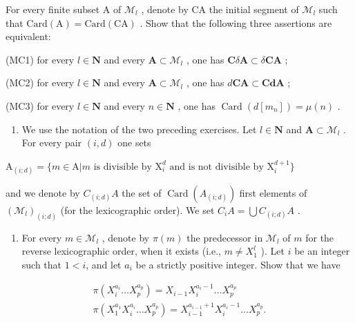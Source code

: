 For every finite subset A of \(\mathcal{M}_{l}\) , denote by CA the initial segment of \(\mathcal{M}_{l}\) such that \(\mathrm{Card(A)} = \mathrm{Card(CA)}\) . Show that the following three assertions are equivalent:

(MC1) for every \(l \in \mathbf{N}\) and every \(\mathbf{A} \subset \mathcal{M}_l\) , one has \(\mathbf{C}\delta \mathbf{A} \subset \delta \mathbf{CA}\) ;

(MC2) for every \(l \in \mathbf{N}\) and every \(\mathbf{A} \subset \mathcal{M}_l\) , one has \(d\mathbf{CA} \subset \mathbf{CdA}\) ;

(MC3) for every \(l \in \mathbf{N}\) and every \(n \in \mathbf{N}\) , one has \(\operatorname{Card}(d[m_n]) = \mu(n)\) .

\begin{enumerate}
\def\labelenumi{\arabic{enumi})}
\setcounter{enumi}{9}
\tightlist
\item
  We use the notation of the two preceding exercises. Let \(l \in \mathbf{N}\) and \(\mathbf{A} \subset \mathcal{M}_l\) . For every pair \((i, d)\) one sets
\end{enumerate}

\(\mathrm{A}_{(i;d)} = \{m \in \mathrm{A} | m \text{ is divisible by } \mathrm{X}_i^d \text{ and is not divisible by } \mathrm{X}_i^{d+1}\}\)

and we denote by \(C_{(i;d)}A\) the set of \(\operatorname{Card}(A_{(i;d)})\) first elements of \((\mathcal{M}_{l})_{(i;d)}\) (for the lexicographic order). We set \(C_{i}A = \bigcup C_{(i;d)}A\) .

\begin{enumerate}
\def\labelenumi{\alph{enumi})}
\tightlist
\item
  For every \(m \in \mathcal{M}_{l}\) , denote by \(\pi(m)\) the predecessor in \(\mathcal{M}_{l}\) of \(m\) for the reverse lexicographic order, when it exists (i.e., \(m \neq X_{1}^{l}\) ). Let \(i\) be an integer such that \(1 < i\), and let \(a_{i}\) be a strictly positive integer. Show that we have
\end{enumerate}

\[
\begin{array}{c} \pi (X _ {i} ^ {a _ {i}} \dots X _ {p} ^ {a _ {p}}) = X _ {i - 1} X _ {i} ^ {a _ {i} - 1} \dots X _ {p} ^ {a _ {p}} \\ \pi (X _ {1} ^ {a _ {1}} X _ {i} ^ {a _ {i}} \dots X _ {p} ^ {a _ {p}}) = X _ {i - 1} ^ {a _ {i - 1} + 1} X _ {i} ^ {a _ {i} - 1} \dots X _ {p} ^ {a _ {p}}. \end{array}
\]

